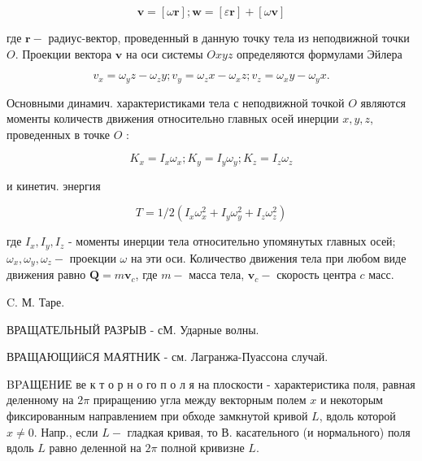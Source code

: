 \documentclass[10pt]{article}
\begin{document}
\[

\boldsymbol{v}=[\omega \boldsymbol{r}] ; \boldsymbol{w}=[\varepsilon \boldsymbol{r}]+[\omega \boldsymbol{v}]

\]



где $\boldsymbol{r}-$ радиус-вектор, проведенный в данную точку тела из неподвижной точки $O$. Проекции вектора $\boldsymbol{v}$ на оси системы $O x y z$ определяются формулами Эйлера



\[

v_{x}=\omega_{y} z-\omega_{z} y ; v_{y}=\omega_{z} x-\omega_{x} z ; v_{z}=\omega_{x} y-\omega_{y} x .

\]



Основными динамич. характеристиками тела с неподвижной точкой $O$ являются моменты количеств движения относительно главных осей инерции $x, y, z$, проведенных в точке $O$ :



\[

K_{x}=I_{x} \omega_{x} ; K_{y}=I_{y} \omega_{y} ; K_{z}=I_{z} \omega_{z}

\]



и кинетич. энергия



\[

T=1 / 2\left(I_{x} \omega_{x}^{2}+I_{y} \omega_{y}^{2}+I_{z} \omega_{z}^{2}\right)

\]



где $I_{x}, I_{y}, I_{z}$ - моменты инерции тела относительно упомянутых главных осей; $\omega_{x}, \omega_{y}, \omega_{z}-$ проекции $\omega$ на эти оси. Количество движения тела при любом виде движения равно $\boldsymbol{Q}=m \boldsymbol{v}_{c}$, где $m-$ масса тела, $\boldsymbol{v}_{c}-$ скорость центра $c$ масс.



C. М. Таре.



ВРАЩАТЕЛЬНЫЙ РАЗРЫВ - сМ. Ударные волны.



ВРАЩАЮЩИйСЯ МАЯТНИК - см. Лагранжа-Пуассона случай.



BPAЩЕHИЕ ве к т о р н о го п о л я на плоскости - характеристика поля, равная деленному на $2 \pi$ приращению угла между векторным полем $x$ и некоторым фиксированным направлением при обходе замкнутой кривой $L$, вдоль которой $x \neq 0$. Напр., если $L-$ гладкая кривая, то В. касательного (и нормального) поля вдоль $L$ равно деленной на $2 \pi$ полной кривизне $L$.
\end{document}

